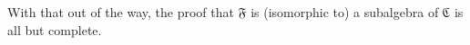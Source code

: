\documentclass[a4paper,UKenglish,cleveref,autoref,thm-restate]{lipics-v2021}
\begin{document}
\ccpad
With that out of the way, the proof that \af 𝔉 is (isomorphic to) a subalgebra of \af ℭ is all but complete.
\ccpad
\begin{code}%
\>[0][@{}l@{\AgdaIndent{1}}]%
\>[1]\AgdaSpace{}%
\AgdaSymbol{:}\AgdaSpace{}%
\AgdaSpace{}%
\AgdaSpace{}%
\AgdaSpace{}%
\AgdaSpace{}%
\AgdaSpace{}%
\AgdaSpace{}%
\AgdaSpace{}%
\<%
\\
%
\>[1]\AgdaSpace{}%
\AgdaSpace{}%
\AgdaSymbol{=}\AgdaSpace{}%
\AgdaSpace{}%
\AgdaSpace{}%
\AgdaSpace{}%
\AgdaOperator{\AgdaInductiveConstructor{,}}\AgdaSpace{}%
\AgdaSymbol{(}\AgdaSpace{}%
\AgdaOperator{\AgdaInductiveConstructor{,}}\AgdaSpace{}%
\AgdaSpace{}%
\AgdaSpace{}%
\AgdaSymbol{)}\<%
\\
\>[1][@{}l@{\AgdaIndent{0}}]%
\>[2]\<%
\\
\>[2][@{}l@{\AgdaIndent{0}}]%
\>[3]\AgdaSpace{}%
\AgdaSymbol{:}\AgdaSpace{}%
\AgdaSpace{}%
\AgdaSpace{}%
\AgdaSpace{}%
\<%
\\
%
\>[3]\AgdaSpace{}%
\AgdaSymbol{=}\AgdaSpace{}%
\AgdaSpace{}%
\AgdaSpace{}%
\AgdaSpace{}%
\AgdaSpace{}%
\AgdaSpace{}%
\<%
\end{code}
\end{document}
